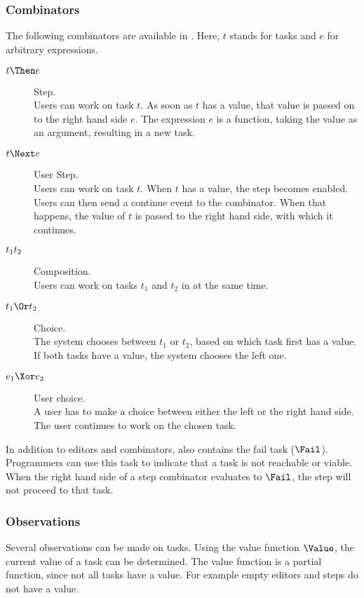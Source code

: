 \subsubsection{Combinators}

The following combinators are available in \TOPHAT.
Here, $t$ stands for tasks and $e$ for arbitrary expressions.
\begin{description}
  \item[$t \Then e$] Step.\\
    Users can work on task $t$.
    As soon as $t$ has a value, that value is passed on to the right hand side $e$.
    The expression $e$ is a function, taking the value as an argument, resulting in a new task.
  \item[$t \Next e$] User Step.\\
    Users can work on task $t$.
    When $t$ has a value, the step becomes enabled.
    Users can then send a continue event to the combinator.
    When that happens, the value of $t$ is passed to the right hand side, with which it continues.
  \item[$t_1 \relax t_2$] Composition.\\
    Users can work on tasks $t_1$ and $t_2$ in at the same time.
  \item[$t_1 \Or t_2$] Choice.\\
    The system chooses between $t_1$ or $t_2$,
    based on which task first has a value.
    If both tasks have a value, the system chooses the left one.
  \item[$e_1 \Xor e_2$] User choice.\\
    A user has to make a choice between either the left or the right hand side.
    The user continues to work on the chosen task.
\end{description}

In addition to editors and combinators, \TOPHAT also contains the fail task ($\Fail$).
Programmers can use this task to indicate that a task is not reachable or viable.
When the right hand side of a step combinator evaluates to $\Fail$, the step will not proceed to that task.




\subsubsection{Observations}

Several observations can be made on tasks.
Using the value function $\Value$, the current value of a task can be determined.
The value function is a partial function, since not all tasks have a value.
For example empty editors and steps do not have a value.

